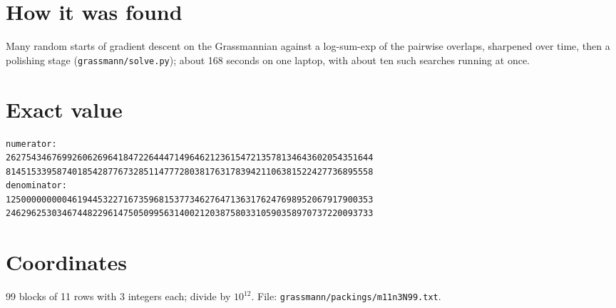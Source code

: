 \documentclass[11pt,a4paper]{article}
\begin{document}
\section{How it was found}
Many random starts of gradient descent on the Grassmannian against a log-sum-exp of the pairwise overlaps, sharpened over time, then a polishing stage (\texttt{grassmann/solve.py}); about 168 seconds on one laptop, with about ten such searches running at once.


\appendix
\section{Exact value}
{\small
\begin{verbatim}
numerator:
262754346769926062696418472264447149646212361547213578134643602054351644
814515339587401854287767328511477728038176317839421106381522427736895558
denominator:
125000000000461944532271673596815377346276471363176247698952067917900353
246296253034674482296147505099563140021203875803310590358970737220093733
\end{verbatim}}

\section{Coordinates}
99 blocks of 11 rows with 3 integers each; divide by $10^{12}$. File: \texttt{grassmann/packings/m11n3N99.txt}.
{\tiny
\begin{multicols}{3}
\end{multicols}}
\end{document}

